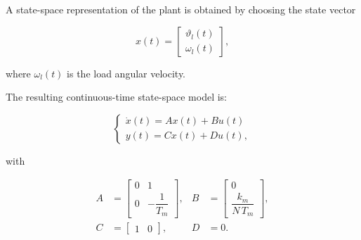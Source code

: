 A state-space representation of the plant is obtained by choosing the state vector

\begin{equation}
x(t)=
\begin{bmatrix}
\vartheta_l(t)\\
\omega_l(t)
\end{bmatrix},
\end{equation}

where $\omega_l(t)$ is the load angular velocity.

The resulting continuous-time state-space model is:

\begin{equation}
\begin{cases}
\dot{x}(t)=Ax(t)+Bu(t)\\
y(t)=Cx(t)+Du(t),
\end{cases}
\end{equation}

with

\begin{equation}
\begin{aligned}
A&=
\begin{bmatrix}
0 & 1\\
0 & -\dfrac{1}{T_m}
\end{bmatrix},
&
B&=
\begin{bmatrix}
0\\
\dfrac{k_m}{N\,T_m}
\end{bmatrix},
\\[1em]
C&=
\begin{bmatrix}
1 & 0
\end{bmatrix},
&
D&=0.
\end{aligned}
\end{equation}


